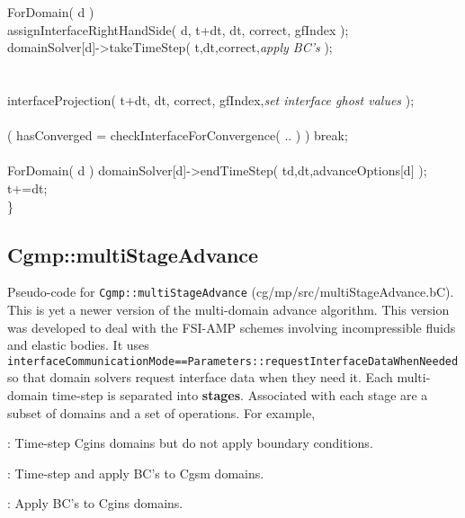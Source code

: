 \begin{flushleft}
\ic       ForDomain( d )\\
\id        assignInterfaceRightHandSide( d, t+dt, dt, correct, gfIndex );  \\
\id        domainSolver[d]->takeTimeStep( t,dt,correct,{\em\green apply BC's} );  \\
\ic \\
\ic       {} \\
\ic       interfaceProjection( t+dt, dt, correct, gfIndex,{\em\green set interface ghost values} ); \\
\ic \\
\ic      \IF( hasConverged = checkInterfaceForConvergence( .. ) ) break; \\
\ib \\
\ib    ForDomain( d ) domainSolver[d]->endTimeStep( td,dt,advanceOptions[d] ); \\
\ib    t+=dt;  \\
\}
\end{flushleft}



\clearpage
\subsection{Cgmp::multiStageAdvance}\label{sec:Cgmp::multiStageAdvance}

Pseudo-code for {\tt Cgmp::multiStageAdvance} (cg/mp/src/multiStageAdvance.bC).
This is yet a newer version of the multi-domain advance algorithm.
This version was developed to deal with the FSI-AMP schemes involving incompressible fluids and elastic
bodies. It uses {\tt interfaceCommunicationMode==Parameters::requestInterfaceDataWhenNeeded} so that
domain solvers request interface data when they need it.
Each multi-domain time-step is separated into \textbf{stages}. 
Associated with each stage are a subset of domains and a set of operations. 
For example,
\begin{description}[noitemsep]
  \item[\qquad Stage 1]: Time-step Cgins domains but do not apply boundary conditions.
  \item[\qquad Stage 2]: Time-step and apply BC's to Cgsm domains.
  \item[\qquad Stage 3]: Apply BC's to Cgins domains.
\end{description}

